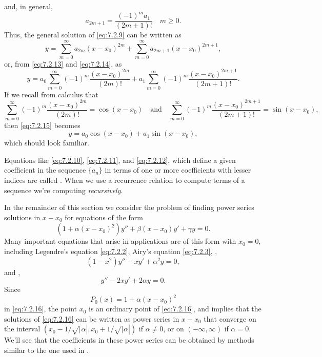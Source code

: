 \begin{solution}
and, in general,
\begin{equation}\label{eq:7.2.14}
a_{2m+1}=\frac{(-1)^ma_1}{(2m+1)!}\quad m\ge0.
\end{equation}
Thus, the general solution of \eqref{eq:7.2.9} can be written as
\[
y=\sum_{m=0}^\infty a_{2m}(x-x_0)^{2m}+\sum_{m=0}^\infty a_{2m+1}(x-x_0)^{2m+1},
\]
or, from \eqref{eq:7.2.13} and \eqref{eq:7.2.14}, as
\begin{equation}\label{eq:7.2.15}
y=a_0\sum_{m=0}^\infty(-1)^m\frac{(x-x_0)^{2m}}{(2m)!}
+a_1\sum_{m=0}^\infty(-1)^m\frac{(x-x_0)^{2m+1}}{(2m+1)!}.
\end{equation}
If we recall from calculus that
\[
\sum_{m=0}^\infty(-1)^m\frac{(x-x_0)^{2m}}{(2m)!}=\cos(x-x_0)
\quad\text{and}\quad
\sum_{m=0}^\infty(-1)^m\frac{(x-x_0)^{2m+1}}{(2m+1)!}=\sin(x-x_0),
\]
then \eqref{eq:7.2.15} becomes
\[
y=a_0\cos(x-x_0)+a_1\sin(x-x_0),
\]
which should look familiar.
\end{solution}

Equations like \eqref{eq:7.2.10}, \eqref{eq:7.2.11}, and \eqref{eq:7.2.12}, which
define a given coefficient in the sequence $\{a_n\}$ in terms of one
or more coefficients with lesser indices are called . When we use a recurrence relation to compute terms
of a sequence we're computing
\emph{\color{blue}recursively}.

In  the remainder of this  section we  consider the problem of
finding power series solutions in $x-x_0$  for equations of the form
\begin{equation}\label{eq:7.2.16}
\left(1+\alpha(x-x_0)^2\right)y''+\beta(x-x_0) y'+\gamma y=0.
\end{equation}
Many important equations that arise in applications are of this
form with $x_0=0$, including  Legendre's equation \eqref{eq:7.2.2},
Airy's equation \eqref{eq:7.2.3},
,
\[
(1-x^2)y''-xy'+\alpha^2 y=0,
\]
and
,
\[
y''-2xy'+2\alpha y=0.
\]
Since
\[
P_0(x)=1+\alpha(x-x_0)^2
\]
in \eqref{eq:7.2.16}, the point $x_0$ is an ordinary point of
\eqref{eq:7.2.16}, and  implies that the solutions
of \eqref{eq:7.2.16} can be written as power series in $x-x_0$ that
converge on the interval $(x_0-1/\sqrt|\alpha|,x_0+1/\sqrt|\alpha|)$
if $\alpha\ne0$, or on $(-\infty,\infty)$ if $\alpha=0$. We'll see
that the coefficients in these power series can be obtained by methods
similar to the one used in .

